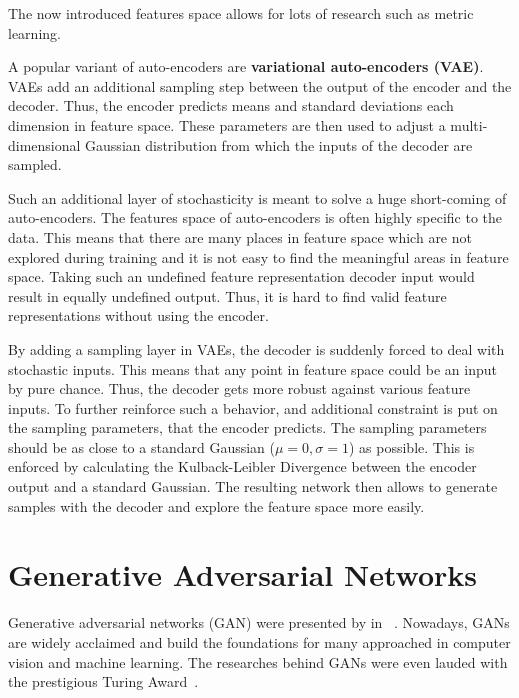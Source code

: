 The now introduced features space allows for lots of research such as metric learning.

A popular variant of auto-encoders are \textbf{variational auto-encoders (VAE)}.
VAEs add an additional sampling step between the output of the encoder and the decoder.
Thus, the encoder predicts means and standard deviations each dimension in feature space.
These parameters are then used to adjust a multi-dimensional Gaussian distribution from which the inputs of the decoder are sampled.

Such an additional layer of stochasticity is meant to solve a huge short-coming of auto-encoders.
The features space of auto-encoders is often highly specific to the data.
This means that there are many places in feature space which are not explored during training and it is not easy to find the meaningful areas in feature space.
Taking such an undefined feature representation decoder input would result in equally undefined output.
Thus, it is hard to find valid feature representations without using the encoder.

By adding a sampling layer in VAEs, the decoder is suddenly forced to deal with stochastic inputs.
This means that any point in feature space could be an input by pure chance.
Thus, the decoder gets more robust against various feature inputs.
To further reinforce such a behavior, and additional constraint is put on the sampling parameters, that the encoder predicts.
The sampling parameters should be as close to a standard Gaussian ($\mu = 0, \sigma = 1$) as possible.
This is enforced by calculating the Kulback-Leibler Divergence between the encoder output and a standard Gaussian.
The resulting network then allows to generate samples with the decoder and explore the feature space more easily.

\section{Generative Adversarial Networks}
Generative adversarial networks (GAN) were presented by \citeauthor*{GAN} in \citeyear{GAN}~\cite{GAN}.
Nowadays, GANs are widely acclaimed and build the foundations for many approached in computer vision and machine learning.
The researches behind GANs were even lauded with the prestigious Turing Award~\cite{turingaward}.

